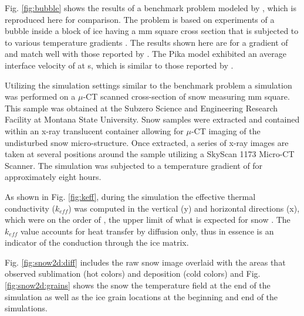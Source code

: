 Fig. \ref{fig:bubble} shows the results of a benchmark problem modeled by \citet{kaempfer2009phase}, which is reproduced here for comparison. The problem is based on experiments of a bubble inside a block of ice having a \unit[5]{mm} square cross section that is subjected to to various temperature gradients \citep{nakaya1956technical, stehle1965technical}. The results shown here are for a gradient of  and match well with those reported by \citet{kaempfer2009phase}. The Pika model exhibited an average interface velocity of  at \unit[7200]{s}, which is similar to those reported by \citet{kaempfer2009phase}.

Utilizing the simulation settings similar to the benchmark problem a simulation was performed on a $\mu$-CT scanned cross-section of snow measuring \unit[5]{mm} square. This sample was obtained at the Subzero Science and Engineering Research Facility at Montana State University. Snow samples were extracted and contained within an x-ray translucent container allowing for $\mu$-CT imaging of the undisturbed snow micro-structure.  Once extracted, a series of x-ray images are taken at several positions around the sample utilizing a SkyScan 1173 Micro-CT Scanner. The simulation was subjected to a temperature gradient of  for approximately eight hours.

As shown in Fig. \ref{fig:keff}, during the simulation the effective thermal conductivity ($k_{eff}$) was computed in the vertical (y) and horizontal directions (x), which were on the order of , the upper limit of what is expected for snow \citep{sturm1997thermal}. The $k_{eff}$ value accounts for heat transfer by diffusion only, thus in essence is an indicator of the conduction through the ice matrix.

Fig. \ref{fig:snow2d:diff} includes the raw snow image overlaid with the areas that observed sublimation (hot colors) and deposition (cold colors) and Fig. \ref{fig:snow2d:grains} shows the snow the temperature field at the end of the simulation as well as the ice grain locations at the beginning and end of the simulations.

